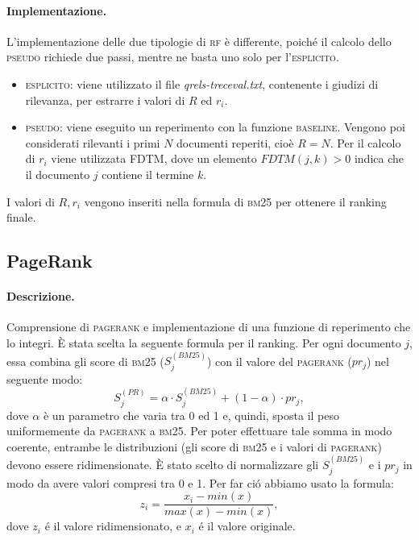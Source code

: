 \paragraph{\textbf{Implementazione.}} 
L'implementazione delle due tipologie di \textsc{rf} \`e differente, poich\'e il calcolo dello \textsc{pseudo} richiede due passi, mentre ne basta uno solo per l'\textsc{esplicito}.
\begin{itemize}
\item \textsc{esplicito}: viene utilizzato il file \textit{qrels-treceval.txt}, contenente i giudizi di rilevanza, per estrarre i valori di $R$ ed $r_i$.
\item \textsc{pseudo}: viene eseguito un reperimento con la funzione \textsc{baseline}. Vengono poi considerati rilevanti i primi $N$ documenti reperiti, cio\`e $R=N$. Per il calcolo di $r_i$ viene utilizzata FDTM, dove un elemento $FDTM(j, k)>0$ indica che il documento $j$ contiene il termine $k$.
\end{itemize}
I valori di $R, r_i$ vengono inseriti nella formula di \textsc{bm25} per ottenere il ranking finale.

\subsection{PageRank}
\label{sec:pagerank}

\paragraph{\textbf{Descrizione.}}
Comprensione di \textsc{pagerank} e implementazione di una funzione di reperimento che lo integri.
\`E stata scelta la seguente formula per il ranking. Per ogni documento $j$, essa combina gli score di \textsc{bm25} ($S^{(BM25)}_j$)  con il valore del \textsc{pagerank} ($pr_j$) nel seguente modo:
\[ S^{(PR)}_j =  \alpha \cdot S^{(BM25)}_j + (1-\alpha) \cdot pr_j,\]
dove $\alpha$ \`e un parametro che varia tra 0 ed 1 e, quindi, sposta il peso uniformemente da \textsc{pagerank} a \textsc{bm25}.
Per poter effettuare tale somma in modo coerente, entrambe le distribuzioni (gli score di \textsc{bm25} e i valori di \textsc{pagerank}) devono essere ridimensionate. \`E stato scelto di normalizzare gli $S^{(BM25)}_j$ e i $pr_j$ in modo da avere valori compresi tra 0 e 1. Per far ci\'o abbiamo usato la formula:
\[ z_i = \frac{x_i - min(x)}{max(x) - min(x)}, \]
dove $z_i$ \'e il valore ridimensionato, e $x_i$ \'e il valore originale.

